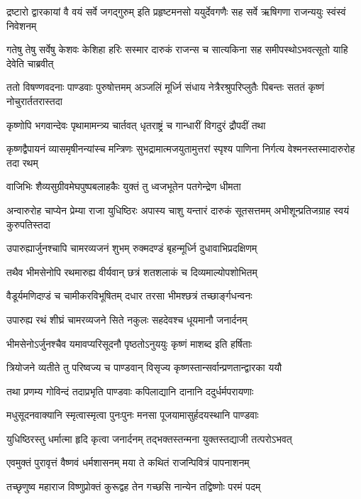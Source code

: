\threelineshloka
{द्रष्टारो द्वारकायां वै वयं सर्वे जगद्गुरुम्}
{इति प्रहृष्टमनसो ययुर्देवगणैः सह}
{सर्वे ऋषिगणा राजन्ययुः स्वंस्वं निवेशनम्}


\threelineshloka
{गतेषु तेषु सर्वेषु केशवः केशिहा हरिः}
{सस्मार दारुकं राजन्स च सात्यकिना सह}
{समीपस्थोऽभवत्सूतो याहि देवेति चाब्रवीत्}


\threelineshloka
{ततो विषण्णवदनाः पाण्डवाः पुरुषोत्तमम्}
{अञ्जलिं मूर्ध्नि संधाय नेत्रैरश्रुपरिप्लुतैः}
{पिबन्तः सततं कृष्णं नोचुरार्ततरास्तदा}


\twolineshloka
{कृष्णोपि भगवान्देवः पृथामामन्त्र्य चार्तवत्}
{धृतराष्ट्रं च गान्धारीं विगदुरं द्रौपदीं तथा}


\threelineshloka
{कृष्णद्वैपायनं व्यासमृषीनन्यांस्च मन्त्रिणः}
{सुभद्रामात्मजयुतामुत्तरां स्पृश्य पाणिना}
{निर्गत्य वेश्मनस्तस्मादारुरोह तदा रथम्}


\twolineshloka
{वाजिभिः शैव्यसुग्रीवमेघपुष्पबलाहकैः}
{युक्तं तु ध्वजभूतेन पतगेन्द्रेण धीमता}


\threelineshloka
{अन्वारुरोह चाप्येन प्रेम्या राजा युधिष्ठिरः}
{अपास्य चाशु यन्तारं दारुकं सूतसत्तमम्}
{अभीशून्प्रतिजग्राह स्वयं कुरुपतिस्तदा}


\twolineshloka
{उपारुह्यार्जुनश्चापि चामरव्यजनं शुभम्}
{रुक्मदण्डं बृहन्मूर्ध्नि दुधावाभिप्रदक्षिणम्}


\twolineshloka
{तथैव भीमसेनोपि रथमारुह्य वीर्यवान्}
{छत्रं शतशलाकं च दिव्यमाल्योपशोभितम्}


\twolineshloka
{वैडूर्यमणिदण़्डं च चामीकरविभूषितम्}
{दधार तरसा भीमश्छत्रं तच्छार्ङ्गधन्वनः}


\twolineshloka
{उपारुह्य रथं शीघ्रं चामरव्यजने सिते}
{नकुलः सहदेवश्च धूयमानौ जनार्दनम्}


\twolineshloka
{भीमसेनोऽर्जुनश्चैव यमावप्यरिसूदनौ}
{पृष्ठतोऽनुययुः कृष्णं माशब्द इति हर्षिताः}


\twolineshloka
{त्रियोजने व्यतीते तु परिष्वज्य च पाण्डवान्}
{विसृज्य कृष्णस्तान्सर्वान्प्रणतान्द्वारका ययौ}


\twolineshloka
{तथा प्रणम्य गोविन्दं तदाप्रभृति पाण्डवाः}
{कपिलाद्यानि दानानि ददुर्धर्मपरायणाः}


\twolineshloka
{मधुसूदनवाक्यानि स्मृत्वास्मृत्वा पुनःपुनः}
{मनसा पूजयामासुर्हदयस्थानि पाण्डवाः}


\twolineshloka
{युधिष्ठिरस्तु धर्मात्मा हृदि कृत्वा जनार्दनम्}
{तद्भक्तस्तन्मना युक्तस्तद्याजी तत्परोऽभवत्}


\twolineshloka
{एवमुक्तं पुरावृत्तं वैष्णवं धर्मशासनम्}
{मया ते कथितं राजन्पिवित्रं पापनाशनम्}


\twolineshloka
{तच्छृणुष्व महाराज विष्णुप्रोक्तं कुरूद्वह}
{तेन गच्छसि नान्येन तद्विष्णोः परमं पदम्}



